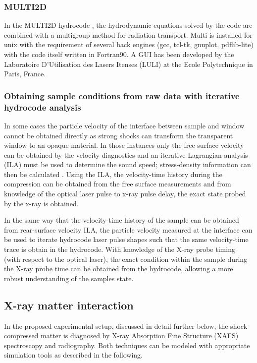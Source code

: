 \documentclass[10pt]{scrartcl}
\begin{document}
\subsubsection{MULTI2D}
In the MULTI2D hydrocode \cite{Ramis2009}, the hydrodynamic equations solved by the code are combined with a multigroup method for radiation transport. Multi is installed for unix with the requirement of several back engines (gcc, tcl-tk, gnuplot, pdflib-lite) with the code itself written in Fortran90. A GUI has been developed by the Laboratoire D'Utilisation des Lasers Itenses (LULI) at the Ecole Polytechnique in Paris, France.

\subsubsection{Obtaining sample conditions from raw data with iterative hydrocode analysis}
In some cases the particle velocity of the interface between sample and window cannot be obtained directly as strong shocks can transform the transparent window to an opaque
material. In those instances only the free surface velocity can be obtained by the velocity diagnostics and an iterative Lagrangian analysis (ILA) must be used to determine the sound
speed; stress-density information can then be calculated \cite{Rothman2006}.  Using the ILA, the velocity-time history during the compression can be obtained from the free surface measurements and from knowledge of the optical laser pulse to x-ray pulse delay, the exact state probed by the x-ray is obtained.

In the same way that the velocity-time history of the sample can be obtained from rear-surface velocity ILA, the particle velocity measured at the interface can be used to iterate hydrocode laser pulse shapes such that the same velocity-time trace is obtain in the hydrocode. With knowledge of the X-ray probe timing (with respect to the optical laser), the exact condition within the sample during the X-ray probe time can be obtained from the hydrocode, allowing a more robust understanding of the samples state.

\subsection{X-ray matter interaction}
In the proposed experimental setup, discussed in detail further below, the shock compressed matter is diagnosed by
X-ray Absorption Fine Structure (XAFS) spectroscopy and radiography. Both techniques can be modeled with appropriate simulation tools as
described in the following.
\end{document}
